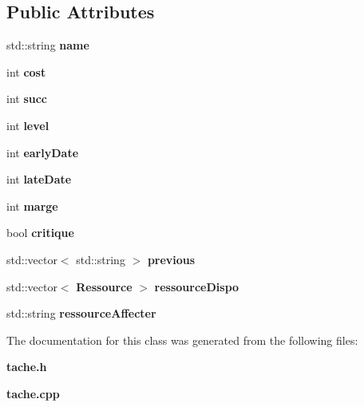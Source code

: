 \subsection*{Public Attributes}
\begin{DoxyCompactItemize}
\item 
std\-::string {\bfseries name}\label{class_tache_a84754769b146cc83b5b09f9eba4cf16a}

\item 
int {\bfseries cost}\label{class_tache_a59891208c44435c233826b0975fdb832}

\item 
int {\bfseries succ}\label{class_tache_adb93208a398b6ac44504f711c9c2d72b}

\item 
int {\bfseries level}\label{class_tache_ae960829eb565a679d61d650f61a5bb34}

\item 
int {\bfseries early\-Date}\label{class_tache_ae4a5f8e17b1115538d5b5d33ba6a116e}

\item 
int {\bfseries late\-Date}\label{class_tache_ae0b3c42bed5ad1660b3c96c6912ab4df}

\item 
int {\bfseries marge}\label{class_tache_a7e17677bad83d53f8fefc3d9e19cbe7e}

\item 
bool {\bfseries critique}\label{class_tache_a080a82ff28eb64709e755c0b0d15ee5d}

\item 
std\-::vector$<$ std\-::string $>$ {\bfseries previous}\label{class_tache_a74d97b66bbc5d8ad6d5c1d7df614b36f}

\item 
std\-::vector$<$ {\bf Ressource} $>$ {\bfseries ressource\-Dispo}\label{class_tache_ab81822e1c0f9e3275091766cf7ccfadd}

\item 
std\-::string {\bfseries ressource\-Affecter}\label{class_tache_a4448f2874e88a7c21016f5812ad68585}

\end{DoxyCompactItemize}


The documentation for this class was generated from the following files\-:\begin{DoxyCompactItemize}
\item 
{\bf tache.\-h}\item 
{\bf tache.\-cpp}\end{DoxyCompactItemize}
